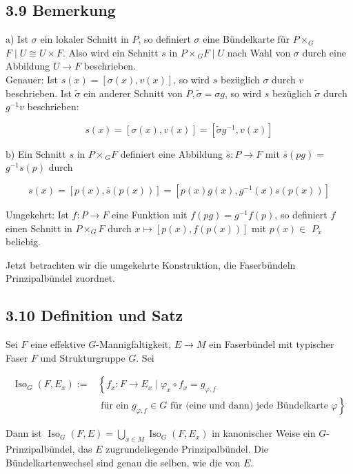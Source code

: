 \subsection*{3.9 Bemerkung}
a) Ist $\sigma$ ein lokaler Schnitt in $P$, so definiert $\sigma$ eine Bündelkarte für $P \times_{G}$ $F \mid U \cong U \times F$. Also wird ein Schnitt $s$ in $P \times{ }_{G} F \mid U$ nach Wahl von $\sigma$ durch eine Abbildung $U \rightarrow F$ beschrieben.\\
Genauer: Ist $s(x)=[\sigma(x), v(x)]$, so wird $s$ bezüglich $\sigma$ durch $v$ beschrieben. Ist $\tilde{\sigma}$ ein anderer Schnitt von $P, \tilde{\sigma}=\sigma g$, so wird $s$ bezüglich $\tilde{\sigma}$ durch $g^{-1} v$ beschrieben:

$$
s(x)=[\sigma(x), v(x)]=\left[\tilde{\sigma} g^{-1}, v(x)\right]
$$

b) Ein Schnitt $s$ in $P \times{ }_{G} F$ definiert eine Abbildung $\bar{s}: P \rightarrow F$ mit $\bar{s}(p g)=$ $g^{-1} s(p)$ durch

$$
s(x)=[p(x), \bar{s}(p(x))]=\left[p(x) g(x), g^{-1}(x) s(p(x))\right]
$$

Umgekehrt: Ist $f: P \rightarrow F$ eine Funktion mit $f(p g)=g^{-1} f(p)$, so definiert $f$ einen Schnitt in $P \times_{G} F$ durch $x \mapsto[p(x), f(p(x))]$ mit $p(x) \in$ $P_{x}$ beliebig.

Jetzt betrachten wir die umgekehrte Konstruktion, die Faserbündeln Prinzipalbündel zuordnet.

\subsection*{3.10 Definition und Satz}
Sei $F$ eine effektive $G$-Mannigfaltigkeit, $E \rightarrow M$ ein Faserbündel mit typischer Faser $F$ und Strukturgruppe $G$. Sei


\begin{align*}
\operatorname{Iso}_{G}\left(F, E_{x}\right):= & \left\{f_{x}: F \rightarrow E_{x} \mid \varphi_{x} \circ f_{x}=g_{\varphi, f}\right. \\
& \text { für ein } \left.g_{\varphi, f} \in G \text { für (eine und dann) jede Bündelkarte } \varphi\right\} \tag{*}
\end{align*}


Dann ist $\operatorname{Iso}_{G}(F, E)=\bigcup_{x \in M} \operatorname{Iso}_{G}\left(F, E_{x}\right)$ in kanonischer Weise ein $G$-Prinzipalbündel, das $E$ zugrundeliegende Prinzipalbündel. Die Bündelkartenwechsel sind genau die selben, wie die von $E$.

